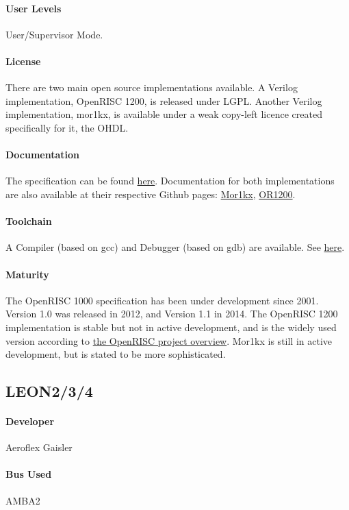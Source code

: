 \paragraph{User Levels} User/Supervisor Mode.
\paragraph{License} There are two main open source implementations available. A Verilog implementation, OpenRISC 1200, is released under LGPL. Another Verilog implementation, mor1kx, is available under a weak copy-left licence created specifically for it, the OHDL.
\paragraph{Documentation} The specification can be found \href{https://github.com/openrisc/doc/blob/master/openrisc-arch-1.1-rev0.pdf?raw=true}{here}. Documentation for both implementations are also available at their respective Github pages: \href{https://github.com/openrisc/mor1kx}{Mor1kx}, \href{https://github.com/openrisc/or1200}{OR1200}.
\paragraph{Toolchain} A Compiler (based on gcc) and Debugger (based on gdb) are available. See \href{http://opencores.org/or1k/OpenRISC_GNU_tool_chain#Tools}{here}.
\paragraph{Maturity} The OpenRISC 1000 specification has been under development since 2001. Version 1.0 was released in 2012, and Version 1.1 in 2014. The OpenRISC 1200 implementation is stable but not in active development, and is the widely used version according to \href{http://openrisc.github.io/}{the OpenRISC project overview}. Mor1kx is still in active development, but is stated to be more sophisticated.

\subsection{LEON2/3/4}
\paragraph{Developer} Aeroflex Gaisler
\paragraph{Bus Used} AMBA2
